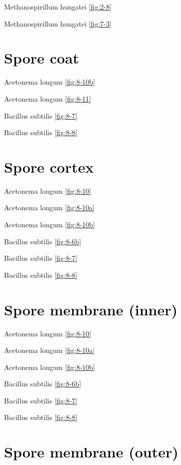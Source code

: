 \documentclass[]{tufte-book}
\begin{document}
Methanospirillum hungatei \ref{fig:2-8}

Methanospirillum hungatei \ref{fig:7-3}

\hypertarget{spore-coat}{%
\section*{Spore coat}\label{spore-coat}}

Acetonema longum \ref{fig:8-10b}

Acetonema longum \ref{fig:8-11}

Bacillus subtilis \ref{fig:8-7}

Bacillus subtilis \ref{fig:8-8}

\hypertarget{spore-cortex}{%
\section*{Spore cortex}\label{spore-cortex}}

Acetonema longum \ref{fig:8-10}

Acetonema longum \ref{fig:8-10a}

Acetonema longum \ref{fig:8-10b}

Bacillus subtilis \ref{fig:8-6b}

Bacillus subtilis \ref{fig:8-7}

Bacillus subtilis \ref{fig:8-8}

\hypertarget{spore-membrane-inner}{%
\section*{Spore membrane (inner)}\label{spore-membrane-inner}}

Acetonema longum \ref{fig:8-10}

Acetonema longum \ref{fig:8-10a}

Acetonema longum \ref{fig:8-10b}

Bacillus subtilis \ref{fig:8-6b}

Bacillus subtilis \ref{fig:8-7}

Bacillus subtilis \ref{fig:8-8}

\hypertarget{spore-membrane-outer}{%
\section*{Spore membrane (outer)}\label{spore-membrane-outer}}
\end{document}
